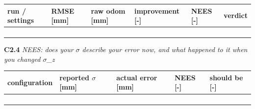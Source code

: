 \documentclass[a4paper,10pt]{article}
\begin{document}
\begin{tabular}{|>{\raggedright\hyphenpenalty 500\arraybackslash}p{2.75cm}|>{\raggedright\hyphenpenalty 500\arraybackslash}p{1.58cm}|>{\raggedright\hyphenpenalty 500\arraybackslash}p{1.58cm}|>{\raggedright\hyphenpenalty 500\arraybackslash}p{3.55cm}|>{\raggedright\hyphenpenalty 500\arraybackslash}p{1.58cm}|>{\raggedright\hyphenpenalty 500\arraybackslash}p{2.47cm}|}
\hline
\textbf{run / settings} & \textbf{RMSE [mm]} & \textbf{raw odom [mm]} & \textbf{improvement [-]} & \textbf{NEES [-]} & \textbf{verdict} \\
\hline
\rule{0pt}{2.4em} & \rule{0pt}{2.4em} & \rule{0pt}{2.4em} & \rule{0pt}{2.4em} & \rule{0pt}{2.4em} & \rule{0pt}{2.4em} \\
\rule{0pt}{2.4em} & \rule{0pt}{2.4em} & \rule{0pt}{2.4em} & \rule{0pt}{2.4em} & \rule{0pt}{2.4em} & \rule{0pt}{2.4em} \\
\rule{0pt}{2.4em} & \rule{0pt}{2.4em} & \rule{0pt}{2.4em} & \rule{0pt}{2.4em} & \rule{0pt}{2.4em} & \rule{0pt}{2.4em} \\
\rule{0pt}{2.4em} & \rule{0pt}{2.4em} & \rule{0pt}{2.4em} & \rule{0pt}{2.4em} & \rule{0pt}{2.4em} & \rule{0pt}{2.4em} \\
\hline
\end{tabular}

\vspace{4pt}\noindent\textbf{C2.4} \emph{NEES: does your \(\sigma\) describe your error now, and what happened to it when you changed \(\sigma\)\_z}

\begin{tabular}{|>{\raggedright\hyphenpenalty 500\arraybackslash}p{4.45cm}|>{\raggedright\hyphenpenalty 500\arraybackslash}p{3.02cm}|>{\raggedright\hyphenpenalty 500\arraybackslash}p{2.40cm}|>{\raggedright\hyphenpenalty 500\arraybackslash}p{1.73cm}|>{\raggedright\hyphenpenalty 500\arraybackslash}p{2.40cm}|}
\hline
\textbf{configuration} & \textbf{reported \(\sigma\) [mm]} & \textbf{actual error [mm]} & \textbf{NEES [-]} & \textbf{should be [-]} \\
\hline
\rule{0pt}{2.4em} & \rule{0pt}{2.4em} & \rule{0pt}{2.4em} & \rule{0pt}{2.4em} & \rule{0pt}{2.4em} \\
\rule{0pt}{2.4em} & \rule{0pt}{2.4em} & \rule{0pt}{2.4em} & \rule{0pt}{2.4em} & \rule{0pt}{2.4em} \\
\rule{0pt}{2.4em} & \rule{0pt}{2.4em} & \rule{0pt}{2.4em} & \rule{0pt}{2.4em} & \rule{0pt}{2.4em} \\
\rule{0pt}{2.4em} & \rule{0pt}{2.4em} & \rule{0pt}{2.4em} & \rule{0pt}{2.4em} & \rule{0pt}{2.4em} \\
\hline
\end{tabular}
\end{document}
